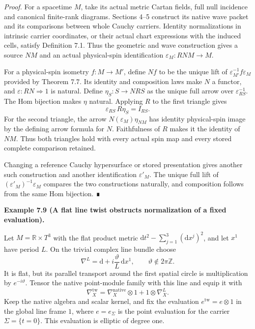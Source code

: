 \documentclass[
  english,
  11pt,
  reqno]{amsart}
\makeatletter
\newcommand{\pandocstatementheading}[1]{%
  \par\if@nobreak\else
    \addpenalty{\@beginparpenalty}%
    \addvspace{.5\baselineskip plus .2\baselineskip minus .2\baselineskip}%
  \fi
  {\normalfont\bfseries #1\par}%
  \nobreak\@afterindenttrue\@afterheading
}
\makeatother
\begin{document}
\emph{Proof.} For a spacetime \(M\), take its actual metric Cartan
fields, full null incidence and canonical finite-rank diagrams. Sections
4--5 construct its native wave packet and its comparisons between whole
Cauchy carriers. Identity normalizations in intrinsic carrier
coordinates, or their actual chart expressions with the induced cells,
satisfy Definition 7.1. Thus the geometric and wave construction gives a
source \(N M\) and an actual physical-spin identification
\(\varepsilon_M:R N M\to M\).

For a physical-spin isometry \(f:M\to M'\), define \(Nf\) to be the
unique lift of \(\varepsilon_{M'}^{-1}f\varepsilon_M\) provided by
Theorem 7.7. Its identity and composition laws make \(N\) a functor, and
\(\varepsilon:RN\Rightarrow1\) is natural. Define \(\eta_S:S\to NRS\) as
the unique full arrow over \(\varepsilon_{RS}^{-1}\). The Hom bijection
makes \(\eta\) natural. Applying \(R\) to the first triangle gives \[
\varepsilon_{RS}\,R\eta_S=I_{RS}.
\] For the second triangle, the arrow \(N(\varepsilon_M)\eta_{NM}\) has
identity physical-spin image by the defining arrow formula for \(N\).
Faithfulness of \(R\) makes it the identity of \(NM\). Thus both
triangles hold with every actual spin map and every stored complete
comparison retained.

Changing a reference Cauchy hypersurface or stored presentation gives
another such construction and another identification \(\varepsilon'_M\).
The unique full lift of \((\varepsilon'_M)^{-1}\varepsilon_M\) compares
the two constructions naturally, and composition follows from the same
Hom bijection. ∎

\pandocstatementheading{\protect{}\label{ex:global-flat-line-normalization}Example 7.9 (A flat line twist obstructs normalization of a fixed
evaluation).}

Let \(M=\mathbb R\times T^3\) with the flat product metric
\(\mathrm dt^2-\sum_{j=1}^3(\mathrm dx^j)^2\), and let \(x^1\) have
period \(L\). On the trivial complex line bundle choose \[
\nabla^L=\mathrm d+i\frac{\vartheta}{L}\,\mathrm dx^1,
\qquad \vartheta\notin2\pi\mathbb Z.
\] It is flat, but its parallel transport around the first spatial
circle is multiplication by \(e^{-i\vartheta}\). Tensor the native
point-module family with this line and equip it with \[
\nabla^{\mathrm{tw}}_X
=\nabla^{\mathrm{native}}_X\otimes1
 +1\otimes\nabla^L_X.
\] Keep the native algebra and scalar kernel, and fix the evaluation
\(e^{\mathrm{tw}}=e\otimes1\) in the global line frame \(1\), where
\(e=e_\Sigma\) is the point evaluation for the carrier
\(\Sigma=\{t=0\}\). This evaluation is elliptic of degree one.
\end{document}
